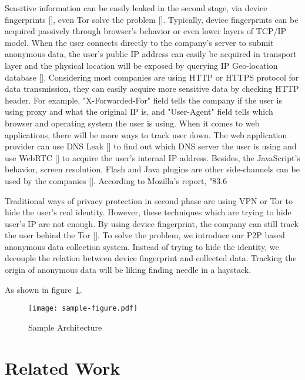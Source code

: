 \documentclass[twocolumn]{article}
\begin{document}
Sensitive information can be easily leaked in the second stage, via device fingerprints [], even Tor solve the problem []. Typically, device fingerprints can be acquired passively through browser's behavior or even lower layers of TCP/IP model. When the user connects directly to the company's server to submit anonymous data, the user's public IP address can easily be acquired in transport layer and the physical location will be exposed by querying IP Geo-location database []. Considering most companies are using HTTP or HTTPS protocol for data transmission, they can easily acquire more sensitive data by checking HTTP header. For example, "X-Forwarded-For" field tells the company if the user is using proxy and what the original IP is, and "User-Agent" field tells which browser and operating system the user is using. When it comes to web applications, there will be more ways to track user down. The web application provider can use DNS Leak [] to find out which DNS server the user is using and use WebRTC [] to acquire the user's internal IP address. Besides, the JavaScript's behavior, screen resolution, Flash and Java plugins are other side-channels can be used by the companies []. According to Mozilla's report, "83.6%

Traditional ways of privacy protection in second phase are using VPN or Tor to hide the user's real identity. However, these techniques which are trying to hide user's IP are not enough. By using device fingerprint, the company can still track the user behind the Tor []. To solve the problem, we introduce our P2P based anonymous data collection system. Instead of trying to hide the identity, we decouple the relation between device fingerprint and collected data. Tracking the origin of anonymous data will be liking finding needle in a haystack.

  As shown in figure~\ref{fig:sample}.

  \begin{figure}[tbh]
    \centering
    \texttt{[image: sample-figure.pdf]}
    \label{fig:sample}
    \caption{Sample Architecture}
  \end{figure}
  



\section{Related Work}


{\footnotesize 

}
\end{document}
